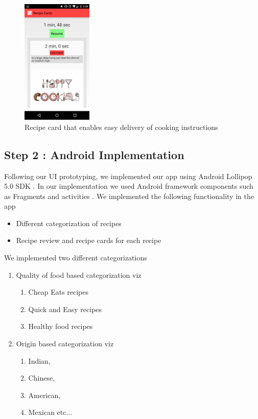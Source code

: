 \begin{figure}[ht!]
	\centering
	\includegraphics[width=0.3\textwidth, height=0.3\textheight]{images/recipe_cards_2.png}
	\caption{Recipe card that enables easy delivery of cooking instructions \label{recipe-card2}}
\end{figure}

\subsection{Step 2 : Android Implementation}
Following our UI prototyping, we implemented our app using Android Lollipop 5.0 SDK 
\cite{lollipop}. 
In our implementation we used Android framework components such as Fragments \cite
{fragments} and activities \cite{activites}. 
We implemented the following functionality in the app 
\begin{itemize}
\item Different categorization of recipes
\item Recipe review and recipe cards \cite{CardView} for each recipe
\end{itemize}
We implemented two different categorizations 
\begin{enumerate}
\item Quality of food based categorization viz
	\begin{enumerate}
		\item Cheap Eats recipes
        \item Quick and Easy recipes
        \item Healthy food recipes
	\end{enumerate}
\item Origin based categorization viz
	\begin{enumerate}
		\item Indian,
        \item Chinese,
        \item American,
        \item Mexican etc... 
	\end{enumerate}
\end{enumerate}

